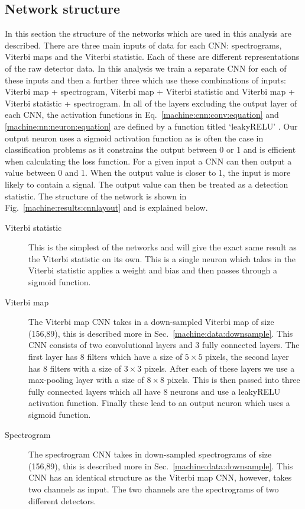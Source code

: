 \subsection{\label{machine:cw:structure}Network structure}

In this section the structure of the networks which are used in this analysis
are described. There are three main inputs of data for each \gls{CNN}: spectrograms, Viterbi maps and the Viterbi statistic. Each of these are different representations of the raw detector data. In this analysis we train a separate \gls{CNN} for each of
these inputs and then a further three which use these combinations of inputs:
Viterbi map + spectrogram, Viterbi map + Viterbi statistic and Viterbi map +
Viterbi statistic + spectrogram. In all of the layers excluding the output layer of each \gls{CNN}, the activation functions in Eq.~\ref{machine:cnn:conv:equation} and \ref{machine:nn:neuron:equation} are defined by a function titled `leakyRELU' \cite{maas2013RectifierNonlinearities}. 
Our output neuron uses a sigmoid activation function as is often the case in classification problems as it constrains the output between 0 or 1 and is efficient when calculating the loss function. 
For a given input a \gls{CNN} can then output a value between 0 and 1. When the output value is closer to 1, the input is more likely to contain a signal. 
The output value can then be treated as a detection statistic. 
The structure of the network is shown in Fig.~\ref{machine:results:cnnlayout} and is explained below. 

\begin{description}
	\item [Viterbi statistic] This is the simplest of the networks and will
	give the exact same result as the Viterbi statistic on its own. This is a
	single neuron which takes in the Viterbi statistic applies a weight and bias
	and then passes through a sigmoid function.
	
	\item [Viterbi map] The Viterbi map \gls{CNN} takes in a down-sampled Viterbi map of size (156,89), this is described more in Sec.~\ref{machine:data:downsample}.
	This \gls{CNN} consists of two convolutional layers and 3 fully connected layers. The first layer has
	8 filters which have a size of $5\times5$ pixels, the second layer has 8
	filters with a size of $3\times3$ pixels. After each of these layers we use a
	max-pooling layer with a size of $8\times8$ pixels. This is then passed into three
	fully connected layers which all have 8 neurons and use a leakyRELU activation
	function. Finally these lead to an output neuron which uses a sigmoid
	function.
	
	\item [Spectrogram] The spectrogram \gls{CNN} takes in down-sampled spectrograms of size (156,89), this is described more in Sec.~\ref{machine:data:downsample}.
	This \gls{CNN} has an identical structure as the Viterbi map \gls{CNN}, however, takes two channels as input. The two channels are the spectrograms of two different detectors.
	
\end{description}


